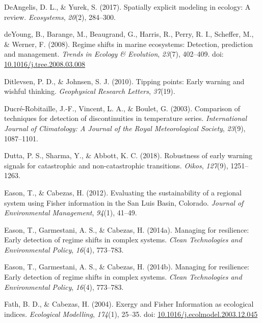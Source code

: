 \documentclass[12pt,twoside,openany]{reedthesis}
\begin{document}
\leavevmode\hypertarget{ref-deangelis2017spatially}{}%
DeAngelis, D. L., \& Yurek, S. (2017). Spatially explicit modeling in ecology: A review. \emph{Ecosystems}, \emph{20}(2), 284--300.

\leavevmode\hypertarget{ref-deyoung_regime_2008}{}%
deYoung, B., Barange, M., Beaugrand, G., Harris, R., Perry, R. I., Scheffer, M., \& Werner, F. (2008). Regime shifts in marine ecosystems: Detection, prediction and management. \emph{Trends in Ecology \& Evolution}, \emph{23}(7), 402--409. doi: \href{https://doi.org/10.1016/j.tree.2008.03.008}{10.1016/j.tree.2008.03.008}

\leavevmode\hypertarget{ref-ditlevsen2010tipping}{}%
Ditlevsen, P. D., \& Johnsen, S. J. (2010). Tipping points: Early warning and wishful thinking. \emph{Geophysical Research Letters}, \emph{37}(19).

\leavevmode\hypertarget{ref-ducre2003comparison}{}%
Ducré-Robitaille, J.-F., Vincent, L. A., \& Boulet, G. (2003). Comparison of techniques for detection of discontinuities in temperature series. \emph{International Journal of Climatology: A Journal of the Royal Meteorological Society}, \emph{23}(9), 1087--1101.

\leavevmode\hypertarget{ref-dutta2018robustness}{}%
Dutta, P. S., Sharma, Y., \& Abbott, K. C. (2018). Robustness of early warning signals for catastrophic and non-catastrophic transitions. \emph{Oikos}, \emph{127}(9), 1251--1263.

\leavevmode\hypertarget{ref-eason_evaluating_2012}{}%
Eason, T., \& Cabezas, H. (2012). Evaluating the sustainability of a regional system using Fisher information in the San Luis Basin, Colorado. \emph{Journal of Environmental Management}, \emph{94}(1), 41--49.

\leavevmode\hypertarget{ref-eason_managing_2014}{}%
Eason, T., Garmestani, A. S., \& Cabezas, H. (2014a). Managing for resilience: Early detection of regime shifts in complex systems. \emph{Clean Technologies and Environmental Policy}, \emph{16}(4), 773--783.

\leavevmode\hypertarget{ref-eason2014managing}{}%
Eason, T., Garmestani, A. S., \& Cabezas, H. (2014b). Managing for resilience: Early detection of regime shifts in complex systems. \emph{Clean Technologies and Environmental Policy}, \emph{16}(4), 773--783.

\leavevmode\hypertarget{ref-fath_exergy_2004}{}%
Fath, B. D., \& Cabezas, H. (2004). Exergy and Fisher Information as ecological indices. \emph{Ecological Modelling}, \emph{174}(1), 25--35. doi: \href{https://doi.org/10.1016/j.ecolmodel.2003.12.045}{10.1016/j.ecolmodel.2003.12.045}
\end{document}
